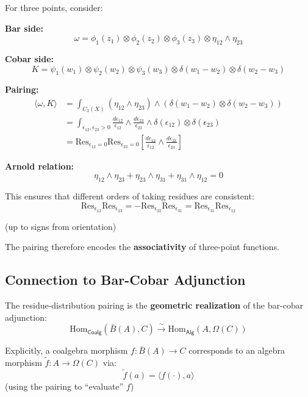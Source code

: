 \begin{example}\label{ex:three-point-arnold-pairing}
For three points, consider:

\textbf{Bar side:}
$$\omega = \phi_1(z_1) \otimes \phi_2(z_2) \otimes \phi_3(z_3) \otimes \eta_{12} \wedge \eta_{23}$$

\textbf{Cobar side:}
$$K = \psi_1(w_1) \otimes \psi_2(w_2) \otimes \psi_3(w_3) \otimes \delta(w_1 - w_2) \otimes 
\delta(w_2 - w_3)$$

\textbf{Pairing:}
\begin{align*}
\langle \omega, K \rangle &= \int_{C_3(X)} (\eta_{12} \wedge \eta_{23}) \wedge 
(\delta(w_1 - w_2) \otimes \delta(w_2 - w_3))\\
&= \int_{\epsilon_{12}, \epsilon_{23} > 0} \frac{d\epsilon_{12}}{\epsilon_{12}} \wedge 
\frac{d\epsilon_{23}}{\epsilon_{23}} \wedge \delta(\epsilon_{12}) \otimes \delta(\epsilon_{23})\\
&= \text{Res}_{\epsilon_{12}=0}\text{Res}_{\epsilon_{23}=0}\left[\frac{d\epsilon_{12}}{\epsilon_{12}} 
\wedge \frac{d\epsilon_{23}}{\epsilon_{23}}\right]
\end{align*}

\textbf{Arnold relation:}
$$\eta_{12} \wedge \eta_{23} + \eta_{23} \wedge \eta_{31} + \eta_{31} \wedge \eta_{12} = 0$$

This ensures that different orders of taking residues are consistent:
$$\text{Res}_{\epsilon_{12}}\text{Res}_{\epsilon_{23}} = -\text{Res}_{\epsilon_{23}}\text{Res}_{\epsilon_{31}}
= \text{Res}_{\epsilon_{31}}\text{Res}_{\epsilon_{12}}$$

(up to signs from orientation)

The pairing therefore encodes the \textbf{associativity} of three-point functions.
\end{example}

\subsection{Connection to Bar-Cobar Adjunction}

\begin{theorem}\label{thm:geometric-adjunction}
The residue-distribution pairing is the \textbf{geometric realization} of the bar-cobar
adjunction:
$$\text{Hom}_{\mathsf{Coalg}}(\bar{B}(A), C) \xrightarrow{\sim} \text{Hom}_{\mathsf{Alg}}(A, \Omega(C))$$

Explicitly, a coalgebra morphism $f: \bar{B}(A) \to C$ corresponds to an algebra morphism
$\tilde{f}: A \to \Omega(C)$ via:
$$\tilde{f}(a) = \langle f(\cdot), a \rangle$$
(using the pairing to ``evaluate'' $f$)
\end{theorem}

